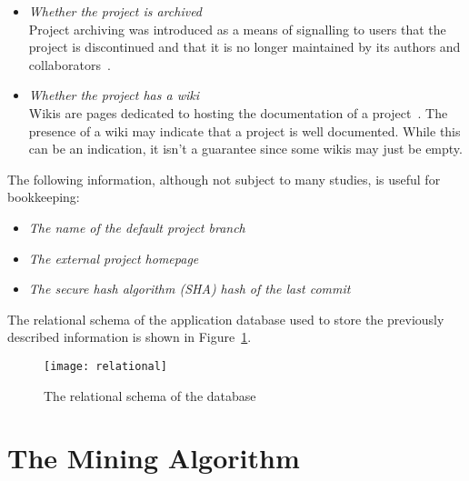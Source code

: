 \begin{itemize}
    \item \textit{Whether the project is archived}
    \\Project archiving was introduced as a means of signalling to users that the project is discontinued and that it is no longer maintained by its authors and collaborators~\cite{ARCHIVINGREPOS}.
    \item \textit{Whether the project has a wiki}
    \\Wikis are pages dedicated to hosting the documentation of a project~\cite{WIKIS}. The presence of a wiki may indicate that a project is well documented. While this can be an indication, it isn't a guarantee since some wikis may just be empty.
\end{itemize}

\noindent
The following information, although not subject to many studies, is useful for bookkeeping:

\begin{itemize}
    \item \textit{The name of the default project branch}
    \item \textit{The external project homepage}
    \item \textit{The secure hash algorithm (SHA) hash of the last commit}
\end{itemize}

\noindent
The relational schema of the application database used to store the previously described information is shown in Figure~\ref{fig:1}.

\newpage
\begin{figure}[ht!]
    \centering
    \texttt{[image: relational]}
    \caption{The relational schema of the database}
    \label{fig:1}
\end{figure}

\newpage
\section{The Mining Algorithm}

